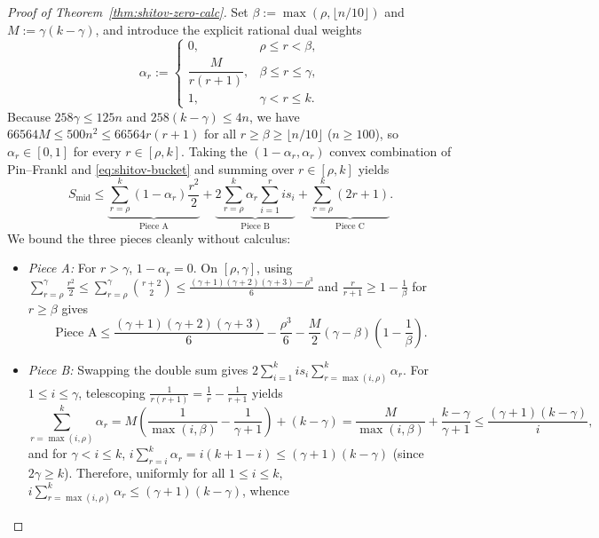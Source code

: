 \documentclass[11pt]{article}
\theoremstyle{definition}
\theoremstyle{remark}
\begin{document}
\begin{proof}[Proof of Theorem~\ref{thm:shitov-zero-calc}]
Set $\beta := \max(\rho, \lfloor n / 10 \rfloor)$ and $M := \gamma(k - \gamma)$, and introduce the explicit rational dual weights
\begin{equation}\label{eq:dual-weights}
  \alpha_r := \begin{cases}
    0, & \rho \le r < \beta, \\
    \dfrac{M}{r(r + 1)}, & \beta \le r \le \gamma, \\
    1, & \gamma < r \le k.
  \end{cases}
\end{equation}
Because $258 \gamma \le 125 n$ and $258(k - \gamma) \le 4 n$, we have $66564 M \le 500 n^2 \le 66564 r(r + 1)$ for all $r \ge \beta \ge \lfloor n/10 \rfloor$ ($n \ge 100$), so $\alpha_r \in [0, 1]$ for every $r \in [\rho, k]$. Taking the $(1 - \alpha_r, \alpha_r)$ convex combination of Pin--Frankl and \eqref{eq:shitov-bucket} and summing over $r \in [\rho, k]$ yields
\begin{equation}\label{eq:dual-combo}
  S_{\mathrm{mid}} \le
    \underbrace{\sum_{r = \rho}^{k} (1 - \alpha_r) \frac{r^2}{2}}_{\text{Piece A}}
    + \underbrace{2 \sum_{r = \rho}^{k} \alpha_r \sum_{i = 1}^{r} i s_i}_{\text{Piece B}}
    + \underbrace{\sum_{r = \rho}^{k} (2r + 1)}_{\text{Piece C}}.
\end{equation}
We bound the three pieces cleanly without calculus:
\begin{itemize}[leftmargin=2em]
  \item \emph{Piece A:} For $r > \gamma$, $1 - \alpha_r = 0$. On $[\rho, \gamma]$, using $\sum_{r=\rho}^\gamma \frac{r^2}{2} \le \sum_{r=\rho}^\gamma \binom{r+2}{2} \le \frac{(\gamma+1)(\gamma+2)(\gamma+3) - \rho^3}{6}$ and $\frac{r}{r+1} \ge 1 - \frac{1}{\beta}$ for $r \ge \beta$ gives
  \[
    \text{Piece A} \le \frac{(\gamma+1)(\gamma+2)(\gamma+3)}{6} - \frac{\rho^3}{6} - \frac{M}{2}(\gamma - \beta)\left(1 - \frac{1}{\beta}\right).
  \]
  \item \emph{Piece B:} Swapping the double sum gives $2 \sum_{i=1}^k i s_i \sum_{r = \max(i, \rho)}^k \alpha_r$. For $1 \le i \le \gamma$, telescoping $\frac{1}{r(r+1)} = \frac{1}{r} - \frac{1}{r+1}$ yields
  \[
    \sum_{r = \max(i, \rho)}^{k} \alpha_r
    = M\left(\frac{1}{\max(i, \beta)} - \frac{1}{\gamma + 1}\right) + (k - \gamma)
    = \frac{M}{\max(i, \beta)} + \frac{k - \gamma}{\gamma + 1}
    \le \frac{(\gamma + 1)(k - \gamma)}{i},
  \]
  and for $\gamma < i \le k$, $i \sum_{r=i}^k \alpha_r = i(k + 1 - i) \le (\gamma + 1)(k - \gamma)$ (since $2\gamma \ge k$). Therefore, uniformly for all $1 \le i \le k$, $i \sum_{r=\max(i,\rho)}^k \alpha_r \le (\gamma + 1)(k - \gamma)$, whence

\end{itemize}
\end{proof}
\end{document}
